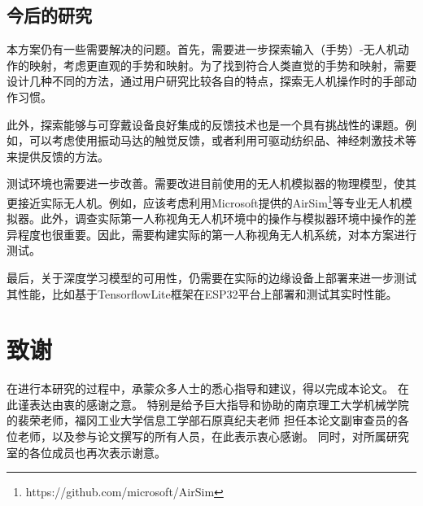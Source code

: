 \subsection{今后的研究}

本方案仍有一些需要解决的问题。首先，需要进一步探索输入（手势）-无人机动作的映射，考虑更直观的手势和映射。为了找到符合人类直觉的手势和映射，需要设计几种不同的方法，通过用户研究比较各自的特点，探索无人机操作时的手部动作习惯。

此外，探索能够与可穿戴设备良好集成的反馈技术也是一个具有挑战性的课题。例如，可以考虑使用振动马达的触觉反馈，或者利用可驱动纺织品、神经刺激技术等来提供反馈的方法。

测试环境也需要进一步改善。需要改进目前使用的无人机模拟器的物理模型，使其更接近实际无人机。例如，应该考虑利用Microsoft提供的AirSim\footnote{https://github.com/microsoft/AirSim}等专业无人机模拟器。此外，调查实际第一人称视角无人机环境中的操作与模拟器环境中操作的差异程度也很重要。因此，需要构建实际的第一人称视角无人机系统，对本方案进行测试。

最后，关于深度学习模型的可用性，仍需要在实际的边缘设备上部署来进一步测试其性能，比如基于TensorflowLite框架在ESP32平台上部署和测试其实时性能。

\newpage
\section*{致谢}
在进行本研究的过程中，承蒙众多人士的悉心指导和建议，得以完成本论文。
在此谨表达由衷的感谢之意。
特别是给予巨大指导和协助的南京理工大学机械学院的裴荣老师，福冈工业大学信息工学部石原真纪夫老师
担任本论文副审查员的各位老师，以及参与论文撰写的所有人员，在此表示衷心感谢。
同时，对所属研究室的各位成员也再次表示谢意。
\ifx\allfiles\undefined

\fi
